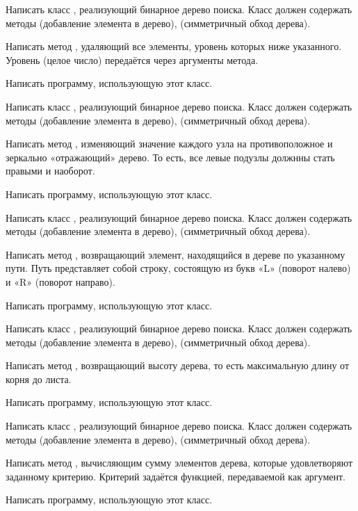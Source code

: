 \task Написать класс , реализующий бинарное дерево
поиска. Класс должен содержать методы  (добавление элемента в
дерево),  (симметричный обход дерева).

Написать метод , удаляющий все элементы, уровень которых
ниже указанного. Уровень (целое число) передаётся через аргументы
метода.

Написать программу, использующую этот класс.

\task Написать класс , реализующий бинарное дерево
поиска. Класс должен содержать методы  (добавление элемента в
дерево),  (симметричный обход дерева).

Написать метод , изменяющий значение каждого узла на
противоположное и зеркально «отражающий» дерево. То есть, все
левые подузлы должнны стать правыми и наоборот.

Написать программу, использующую этот класс.

\task Написать класс , реализующий бинарное дерево
поиска. Класс должен содержать методы  (добавление элемента в
дерево),  (симметричный обход дерева).

Написать метод , возвращающий элемент, находящийся в
дереве по указанному пути. Путь представляет собой
строку, состоящую из букв «L» (поворот налево) и «R» (поворот
направо).

Написать программу, использующую этот класс.

\task Написать класс , реализующий бинарное дерево
поиска. Класс должен содержать методы  (добавление элемента в
дерево),  (симметричный обход дерева).

Написать метод , возвращающий высоту дерева, то есть
максимальную длину от корня до листа.

Написать программу, использующую этот класс.

\task Написать класс , реализующий бинарное дерево
поиска. Класс должен содержать методы  (добавление элемента в
дерево),  (симметричный обход дерева).

Написать метод , вычисляющим сумму элементов дерева, которые
удовлетворяют заданному критерию. Критерий задаётся функцией,
передаваемой как аргумент.

Написать программу, использующую этот класс.
